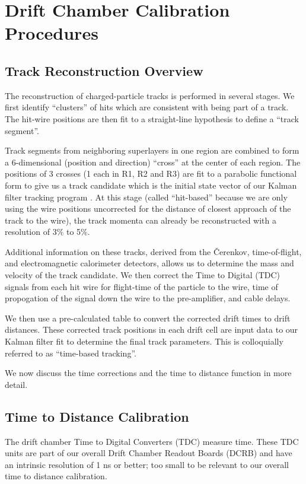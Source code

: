 \section{Drift Chamber Calibration Procedures}

\subsection{Track Reconstruction Overview}

The reconstruction of charged-particle tracks is performed in several stages.  
We first identify ``clusters'' of hits which are consistent 
with being part of a track.
The hit-wire positions are then fit to a straight-line hypothesis to
define a ``track segment''.  

Track segments from neighboring superlayers in one region are combined
to form a 6-dimensional (position and direction) ``cross'' at the center
of each region.
The positions of 3 crosses (1 each in R1, R2 and R3) are fit to a
parabolic functional form to give us a track candidate which
is the initial state vector of our Kalman filter tracking program .
At this stage (called ``hit-based'' because we are only using the wire positions
uncorrected for the distance of closest approach of the
track to the wire), the track momenta can already be reconstructed 
with a resolution of 3$\%$ to 5$\%$.

Additional information on these tracks, derived
from the {\v C}erenkov, time-of-flight, and electromagnetic calorimeter 
detectors, allows us to determine the mass and velocity of the 
track candidate.  We then correct the Time to Digital (TDC) signals from
each hit wire for flight-time of the particle to the wire, time of propogation
of the signal down the wire to the pre-amplifier, and cable delays.

We then use a pre-calculated table 
to convert the corrected drift times to drift distances.  These corrected 
track positions in each drift cell are input data to our Kalman filter
fit to determine the final track parameters.  This is colloquially referred
to as ``time-based tracking''.

We now discuss the time corrections and the time to distance function in more detail.

\subsection{Time to Distance Calibration}
The drift chamber Time to Digital Converters (TDC) measure time.  
These TDC units are part of our overall Drift Chamber Readout Boards (DCRB) and
have an intrinsic resolution of 1 ns or better; too small to be relevant to
our overall time to distance calibration.


